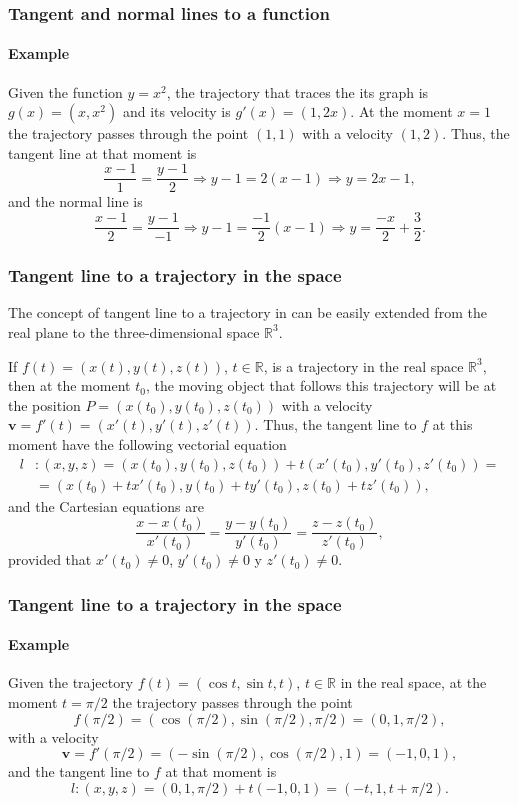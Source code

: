 \begin{frame}
\frametitle{Tangent and normal lines to a function}
\framesubtitle{Example}
Given the function $y=x^2$, the trajectory that traces the its graph is $g(x)=(x,x^2)$ and its velocity is 
$g'(x)=(1,2x)$. At the moment $x=1$ the trajectory passes through the point $(1,1)$ with a velocity $(1,2)$.
Thus, the tangent line at that moment is 
\[
\frac{x-1}{1} = \frac{y-1}{2} \Rightarrow y-1 = 2(x-1) \Rightarrow y = 2x-1,
\]
and the normal line is 
\[
\frac{x-1}{2} = \frac{y-1}{-1} \Rightarrow y-1 = \frac{-1}{2}(x-1) \Rightarrow y = \frac{-x}{2}+\frac{3}{2}.
\]
\begin{center}

\end{center}
\end{frame}


\begin{frame}
\frametitle{Tangent line to a trajectory in the space}
The concept of tangent line to a trajectory in can be easily extended from the real plane to the three-dimensional space $\mathbb{R}^3$.

If $f(t)=(x(t),y(t),z(t))$, $t\in \mathbb{R}$, is a trajectory in the real space $\mathbb{R}^3$, then at the moment $t_0$, the moving object that follows this trajectory will be at the position $P=(x(t_0),y(t_0),z(t_0))$ with a velocity $\mathbf{v}=f'(t)=(x'(t),y'(t),z'(t))$.
Thus, the tangent line to $f$ at this moment have the following vectorial equation
\begin{align*}
l&: (x,y,z)=(x(t_0),y(t_0),z(t_0))+t(x'(t_0),y'(t_0),z'(t_0)) =\\
&= (x(t_0)+tx'(t_0),y(t_0)+ty'(t_0),z(t_0)+tz'(t_0)),
\end{align*}
and the Cartesian equations are 
\[
\frac{x-x(t_0)}{x'(t_0)}=\frac{y-y(t_0)}{y'(t_0)}=\frac{z-z(t_0)}{z'(t_0)},
\]
provided that $x'(t_0)\neq 0$, $y'(t_0)\neq 0$ y $z'(t_0)\neq 0$.
\end{frame}


\begin{frame}
\frametitle{Tangent line to a trajectory in the space}
\framesubtitle{Example}
Given the trajectory $f(t)=(\cos t, \sin t, t)$, $t\in \mathbb{R}$ in the real space, at the moment $t=\pi/2$ the trajectory passes through the point
\[
f(\pi/2)=(\cos(\pi/2),\sin(\pi/2),\pi/2)=(0,1,\pi/2),
\]
with a velocity
\[
\mathbf{v}=f'(\pi/2)=(-\sin(\pi/2),\cos(\pi/2), 1)=(-1,0,1),
\] 
and the tangent line to $f$ at that moment is 
\[
l:(x,y,z)=(0,1,\pi/2)+t(-1,0,1) = (-t,1,t+\pi/2).
\]
\begin{center}

\end{center}
\end{frame}


